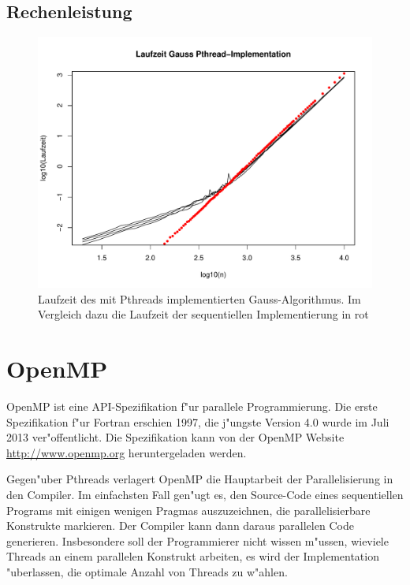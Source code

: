 \subsection{Rechenleistung}
\begin{figure}
\begin{center}
\includegraphics[width=\hsize]{images/gauss-pthread.pdf}
\end{center}
\caption{Laufzeit des mit Pthreads implementierten Gauss-Algorithmus.
Im Vergleich dazu die Laufzeit der sequentiellen Implementierung 
in rot\label{gauss-pthread}}
\end{figure}

\section{OpenMP\label{openmp-intro}}
OpenMP ist eine API-Spezifikation f"ur parallele Programmierung.
Die erste Spezifikation f"ur Fortran erschien 1997, die j"ungste 
Version 4.0 wurde im Juli 2013 ver"offentlicht.
Die Spezifikation kann von der OpenMP Website \url{http://www.openmp.org}
heruntergeladen werden.

Gegen"uber Pthreads verlagert OpenMP die Hauptarbeit der Parallelisierung
in den Compiler. 
Im einfachsten Fall gen"ugt es, den Source-Code eines sequentiellen Programs
mit einigen wenigen Pragmas auszuzeichnen, die parallelisierbare
Konstrukte markieren. Der Compiler kann dann daraus parallelen Code
generieren. Insbesondere soll der Programmierer nicht wissen m"ussen, wieviele
Threads an einem parallelen Konstrukt arbeiten, es wird der Implementation
"uberlassen, die optimale Anzahl von Threads zu w"ahlen.

